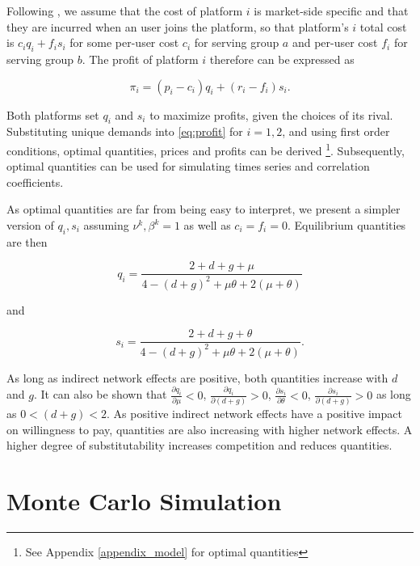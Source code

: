\documentclass[12pt,a4paper]{scrreprt}
\begin{document}
Following \cite{armstrong_competition_2006}, we assume that the cost of platform $i$ is market-side specific and that they are incurred when an user joins the platform, so that platform's $i$ total cost is $c_i q_i+f_i s_i$ for some per-user cost $c_i$ for serving group $a$ and per-user cost $f_i$ for serving group $b$. The profit of platform $i$ therefore can be expressed as 

\begin{equation}\label{eq:profit}
\pi_i=(p_i-c_i)q_i+(r_i-f_i)s_i.
\end{equation}

Both platforms set $q_i$ and $s_i$ to maximize profits, given the choices of its rival. Substituting unique demands into \ref{eq:profit} for $i=1,2$, and using first order conditions, optimal quantities, prices and profits can be derived \footnote{See Appendix \ref{appendix_model} for optimal quantities}. Subsequently, optimal quantities can be used for simulating times series and correlation coefficients. 


 As optimal quantities are far from being easy to interpret, we present a simpler version of $q_i, s_i$ assuming $\nu^k, \beta^k=1$  as well as $c_i=f_i=0$. Equilibrium quantities are then

\begin{equation}\label{eq_quantities1}
	q_i=\frac{2+d+g+\mu}{4-(d+g)^2+\mu\theta+2(\mu+\theta)}
\end{equation}

and

\begin{equation}\label{eq_quantities2}
	s_i=\frac{2+d+g+\theta}{4-(d+g)^2+\mu\theta+2(\mu+\theta)}.
\end{equation}

As long as indirect network effects are positive, both quantities increase with $d$ and $g$. It can also be shown that $\frac{\partial q_i}{\partial \mu}<0$, $\frac{\partial q_i}{\partial (d+g)}>0$, $\frac{\partial s_i}{\partial \theta}<0$, $\frac{\partial s_i}{\partial (d+g)}>0$ as long as $0<(d+g)<2$. As positive indirect network effects have a positive impact on willingness to pay, quantities are also increasing with higher network effects. A higher degree of substitutability increases competition and reduces quantities.  


\chapter{Monte Carlo Simulation}
\end{document}
